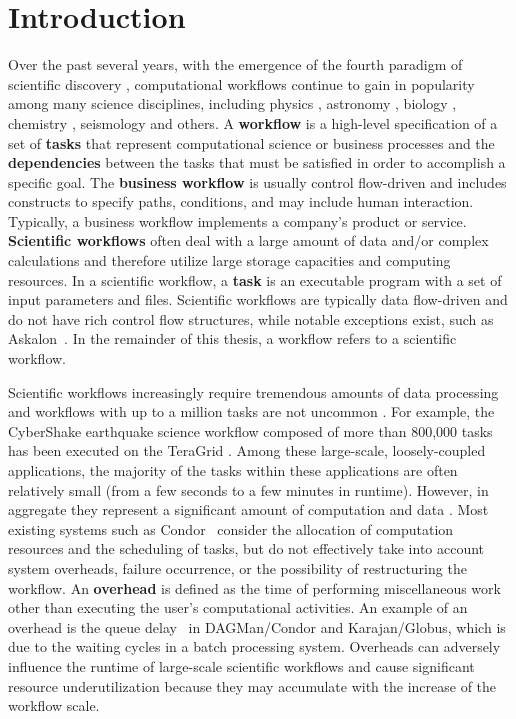 \chapter{Introduction}


Over the past several years, with the emergence of the fourth paradigm of scientific discovery \cite{Hey2009}, computational workflows continue to gain in popularity among many science disciplines, including physics \cite{Deelman2002}, astronomy \cite{Sakellariou2010}, biology \cite{Lathers2006, Oinn2004}, chemistry \cite{Wieczorek2005}, seismology \cite{Maechling2007} and others. 
A \textbf{workflow} is a high-level specification of a set of \textbf{tasks} that represent computational science or business processes and the \textbf{dependencies} between the tasks that must be satisfied in order to accomplish a specific goal. The \textbf{business workflow} is usually control flow-driven and includes constructs to specify paths, conditions, and may include human interaction. Typically, a business workflow implements a company’s product or service. \textbf{Scientific workflows} often deal with a large amount of data and/or complex calculations and therefore utilize large storage capacities and computing resources. In a scientific workflow, a \textbf{task} is an executable program with a set of input parameters and files. Scientific workflows are typically data flow-driven and do not have rich control flow structures, while notable exceptions exist, such as Askalon~\cite{Ostermann2009b}. In the remainder of this thesis, a workflow refers to a scientific workflow. 


Scientific workflows increasingly require tremendous amounts of data processing and workflows with up to a million tasks are not uncommon \cite{Callaghan2011}. For example, the CyberShake earthquake science workflow \cite{Rynge2012} composed of more than 800,000 tasks has been executed on the TeraGrid \cite{TeraGrid}. Among these large-scale, loosely-coupled applications, the majority of the tasks within these applications are often relatively small (from a few seconds to a few minutes in runtime). However, in aggregate they represent a significant amount of computation and data \cite{Deelman2002}. Most existing systems such as Condor~\cite{Kalayci2010} consider the allocation of computation resources and the scheduling of tasks, but do not effectively take into account system overheads, failure occurrence, or the possibility of restructuring the workflow. 
An \textbf{overhead} is defined as the time of performing miscellaneous work other than executing the user's computational activities. An example of an overhead is the queue delay~\cite{Stratan2008} in DAGMan/Condor and Karajan/Globus, which is due to the waiting cycles in a batch processing system. Overheads can adversely influence the runtime of large-scale scientific workflows and cause significant resource underutilization \cite{Chen2011} because they may accumulate with the increase of the workflow scale. 

